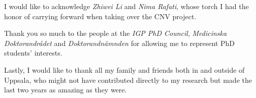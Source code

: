 \documentclass[twoside=false]{scrbook}
\begin{document}
I would like to acknowledge \textit{Zhiwei Li} and \textit{Nima Rafati}, whose torch I had the honor of carrying forward when taking over the CNV project.

Thank you so much to the people at the \textit{IGP PhD Council}, \textit{Medicinska Doktorandrådet} and \textit{Doktorandnämnden} for allowing me to represent PhD students' interests.

Lastly, I would like to thank all my family and friends both in and outside of Uppsala, who might not have contributed directly to my research but made the last two years as amazing as they were.


\printglossary[type=\acronymtype]

\printglossary

\printbibliography[notcategory=myworks,heading=bibintoc]
\end{document}
